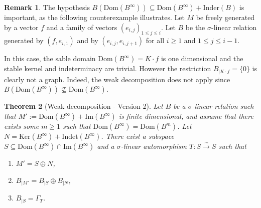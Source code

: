 \documentclass[12pt]{amsart}
\newtheorem{theorem}{Theorem}[section]
\theoremstyle{definition}
\newtheorem{remark}[theorem]{Remark}
\newcommand{\<}{\langle}   %
\renewcommand{\>}{\rangle} %
\begin{document}
\begin{remark}
The hypothesis $B(\mathrm{Dom}(B^{\infty})) \subseteq  \mathrm{Dom}(B^{\infty}) + \mathrm{Inder}(B)$ is important, as the following counterexample illustrates. Let $M$ be freely generated by a vector $f$ and a family of vectors $(e_{i,j})_{1\leq j \leq i}$. Let $B$ be the $\sigma$-linear relation generated by $(f,e_{i,1})$ and by $(e_{i,j},e_{i,j+1})$ for all $i\geq 1$ and $1 \leq j \leq i-1$. 


In this case, the sable domain $\mathrm{Dom}(B^{\infty}) = K\cdot f$ is one dimensional and the stable kernel and indeterminacy are trivial. However the restriction $B_{|K\cdot f} = \{0\}$ is clearly not a graph. Indeed, the weak decomposition does not apply since $B(\mathrm{Dom}(B^{\infty})) \not \subseteq  \mathrm{Dom}(B^{\infty})$.
\end{remark}


\begin{theorem}[Weak decomposition - Version 2]\label{WeakDecomposition2}
    Let $B$ be a $\sigma$-linear relation such that $M' := \mathrm{Dom}(B^{\infty}) + \mathrm{Im}(B^{\infty})$ is finite dimensional, and assume that there exists some $m\geq 1$ such that $\mathrm{Dom}(B^{\infty}) = \mathrm{Dom}(B^m)$. Let $N = \mathrm{Ker}(B^{\infty}) + \mathrm{Indet}(B^{\infty})$. There exist a subspace $S \subseteq  \mathrm{Dom}(B^{\infty}) \cap \mathrm{Im}(B^{\infty})$ and a $\sigma$-linear automorphism $T:S\xrightarrow{\sim} S$ such that 
    \begin{enumerate}
        \item $M' = S \oplus N$,
        \item $B_{|M'}= B_{|S} \oplus B_{|N}$,
        \item $B_{|S} = \Gamma_T$.
    \end{enumerate}
\end{theorem}
\end{document}
